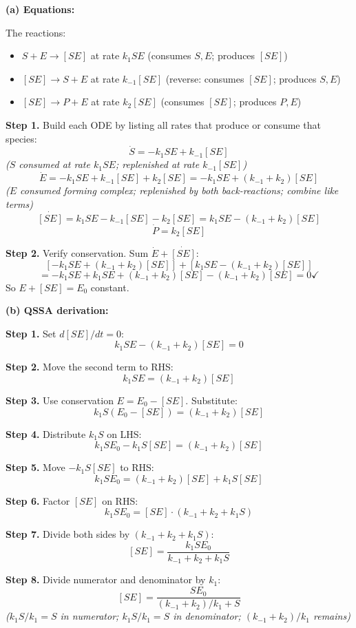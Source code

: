 \documentclass[10pt]{article}
\newcommand{\stepwhy}[1]{\textcolor{blue!60!black}{\small\textit{(#1)}}}
\begin{document}
\begin{solution}
\textbf{(a) Equations:}

The reactions:
\begin{itemize}
\item $S + E \to [SE]$ at rate $k_1 SE$ (consumes $S, E$; produces $[SE]$)
\item $[SE] \to S + E$ at rate $k_{-1}[SE]$ (reverse: consumes $[SE]$; produces $S, E$)
\item $[SE] \to P + E$ at rate $k_2[SE]$ (consumes $[SE]$; produces $P, E$)
\end{itemize}

\textbf{Step 1.} Build each ODE by listing all rates that produce or consume that species:
\[
\dot S = -k_1 SE + k_{-1}[SE]
\]
\stepwhy{$S$ consumed at rate $k_1 SE$; replenished at rate $k_{-1}[SE]$}
\[
\dot E = -k_1 SE + k_{-1}[SE] + k_2[SE] = -k_1 SE + (k_{-1}+k_2)[SE]
\]
\stepwhy{$E$ consumed forming complex; replenished by both back-reactions; combine like terms}
\[
\dot{[SE]} = k_1 SE - k_{-1}[SE] - k_2[SE] = k_1 SE - (k_{-1}+k_2)[SE]
\]
\[
\dot P = k_2[SE]
\]

\textbf{Step 2.} Verify conservation. Sum $\dot E + \dot{[SE]}$:
\[
[-k_1 SE + (k_{-1}+k_2)[SE]] + [k_1 SE - (k_{-1}+k_2)[SE]]
\]
\[
= -k_1 SE + k_1 SE + (k_{-1}+k_2)[SE] - (k_{-1}+k_2)[SE] = 0 \checkmark
\]
So $E + [SE] = E_0$ constant.

\medskip\textbf{(b) QSSA derivation:}

\textbf{Step 1.} Set $d[SE]/dt = 0$:
\[
k_1 SE - (k_{-1}+k_2)[SE] = 0
\]

\textbf{Step 2.} Move the second term to RHS:
\[
k_1 SE = (k_{-1}+k_2)[SE]
\]

\textbf{Step 3.} Use conservation $E = E_0 - [SE]$. Substitute:
\[
k_1 S(E_0 - [SE]) = (k_{-1}+k_2)[SE]
\]

\textbf{Step 4.} Distribute $k_1 S$ on LHS:
\[
k_1 S E_0 - k_1 S [SE] = (k_{-1}+k_2)[SE]
\]

\textbf{Step 5.} Move $-k_1 S[SE]$ to RHS:
\[
k_1 S E_0 = (k_{-1}+k_2)[SE] + k_1 S[SE]
\]

\textbf{Step 6.} Factor $[SE]$ on RHS:
\[
k_1 S E_0 = [SE]\cdot(k_{-1} + k_2 + k_1 S)
\]

\textbf{Step 7.} Divide both sides by $(k_{-1} + k_2 + k_1 S)$:
\[
[SE] = \frac{k_1 S E_0}{k_{-1} + k_2 + k_1 S}
\]

\textbf{Step 8.} Divide numerator and denominator by $k_1$:
\[
[SE] = \frac{S E_0}{(k_{-1}+k_2)/k_1 + S}
\]
\stepwhy{$k_1 S/k_1 = S$ in numerator; $k_1 S/k_1 = S$ in denominator; $(k_{-1}+k_2)/k_1$ remains}


\end{solution}
\end{document}
